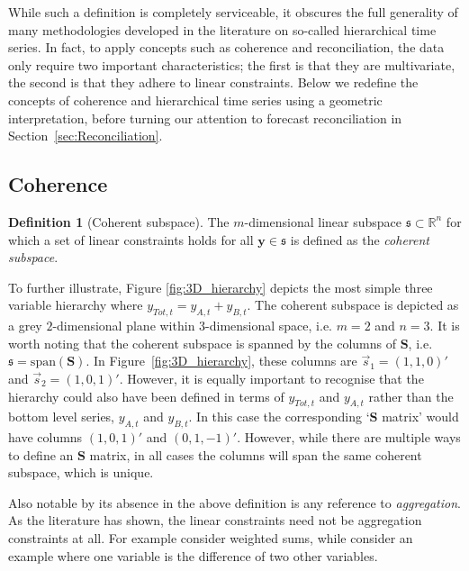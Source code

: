 \documentclass[12pt]{article}
\theoremstyle{definition}
\newtheorem{definition}{Definition}[section]
\theoremstyle{property}
\begin{document}
	While such a definition is completely serviceable, it obscures the full generality of many methodologies developed in the literature on so-called hierarchical time series.  In fact, to apply concepts such as coherence and reconciliation, the data only require two important characteristics; the first is that they are multivariate, the second is that they adhere to linear constraints.  Below we redefine the concepts of coherence and hierarchical time series using a geometric interpretation, before turning our attention to forecast reconciliation in Section~\ref{sec:Reconciliation}.
	
	
	\subsection{Coherence}\label{sec:cohpointf}
	
	 \begin{definition}[Coherent subspace]\label{def:cohspace}
	 	The $m$-dimensional linear subspace $\mathfrak{s}\subset \mathbb{R}^n$ for which a set of linear constraints holds for all $\bm{y}\in\mathfrak{s}$ is defined as the \emph{coherent subspace}.
	 \end{definition}
 
     To further illustrate, Figure \ref{fig:3D_hierarchy} depicts the most simple three variable hierarchy where $y_{Tot,t}=y_{A,t}+y_{B,t}$.  The coherent subspace is depicted as a grey $2$-dimensional plane within $3$-dimensional space, i.e. $m=2$ and $n=3$.  It is worth noting that the coherent subspace is spanned by the columns of $\bm{S}$, i.e.\ $\mathfrak{s}=\text{span}(\bm{S})$.  In Figure~\ref{fig:3D_hierarchy}, these columns are $\vec{s}_1=(1,1,0)'$ and $\vec{s}_2=(1,0,1)'$.  However, it is equally important to recognise that the hierarchy could also have been defined in terms of $y_{Tot,t}$ and $y_{A,t}$ rather than the bottom level series, $y_{A,t}$ and $y_{B,t}$. In this case the corresponding `$\bm{S}$ matrix' would have columns $(1,0,1)'$ and $(0,1,-1)'$.  However, while there are multiple ways to define an $\bm{S}$ matrix, in all cases the columns will span the same coherent subspace, which is unique.
     
     Also notable by its absence in the above definition is any reference to {\em aggregation}.  As the literature has shown, the linear constraints need not be aggregation constraints at all. For example  consider weighted sums, while  consider an example where one variable is the difference of two other variables. 
     
\end{document}
